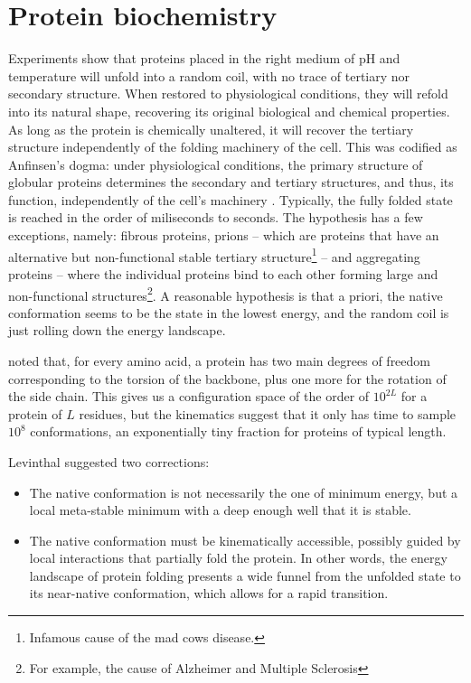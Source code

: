 \section{Protein biochemistry}

Experiments show that proteins placed in the right medium of pH and temperature will unfold into a random coil, with no trace of tertiary nor secondary structure.
When restored to physiological conditions, they will refold into its natural shape, recovering its original biological and chemical properties.
As long as the protein is chemically unaltered, it will recover the tertiary structure independently of the folding machinery of the cell.
This was codified as Anfinsen's dogma: under physiological conditions, the primary structure of globular proteins determines the secondary and tertiary structures, and thus, its function, independently of the cell's machinery \citep{Anfinsen_dogma}.
Typically, the fully folded state is reached in the order of miliseconds to seconds.
The hypothesis has a few exceptions, namely: fibrous proteins, prions -- which are proteins that have an alternative but non-functional stable tertiary structure\footnote{Infamous cause of the mad cows disease.} -- and aggregating proteins -- where the individual proteins bind to each other forming large and non-functional structures\footnote{For example, the cause of Alzheimer and Multiple Sclerosis}.
A reasonable hypothesis is that a priori, the native conformation seems to be the state in the lowest energy, and the random coil is just rolling down the energy landscape.

\citet{fold_graciously}  noted that, for every amino acid, a protein has two main degrees of freedom corresponding to the torsion of the backbone, plus one more for the rotation of the side chain.
This gives us a configuration space of the order of $10^{2L}$ for a protein of $L$ residues, but the kinematics suggest that it only has time to sample $10^8$ conformations, an exponentially tiny fraction for proteins of typical length.

Levinthal suggested two corrections:
\begin{itemize}
	\item The native conformation is not necessarily the one of minimum energy, but a local meta-stable minimum with a deep enough well that it is stable.
	\item The native conformation must be kinematically accessible, possibly guided by local interactions that partially fold the protein.
	In other words, the energy landscape of protein folding presents a wide funnel from the unfolded state to its near-native conformation, which allows for a rapid transition.
\end{itemize}

